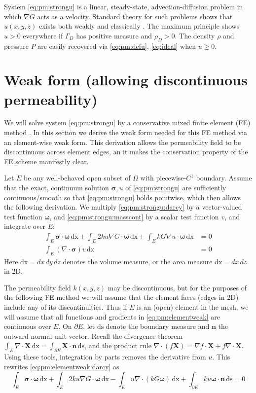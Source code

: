 \documentclass[11pt]{amsart}
\newcommand{\bn}{\mathbf{n}}
\newcommand{\bX}{\mathbf{X}}
\newcommand{\bsigma}{\bm{\sigma}}
\newcommand{\bomega}{\bm{\omega}}
\newcommand{\dx}{\mathrm{dx}}
\newcommand{\ds}{\mathrm{ds}}
\newcommand{\Div}{\nabla\cdot}
\newcommand{\grad}{\nabla}
\begin{document}
System \eqref{eq:pm:strongu} is a linear, steady-state, advection-diffusion problem in which $\grad G$ acts as a velocity.  Standard theory for such problems shows that $u(x,y,z)$ exists both weakly and classically \citep[Chapter 6]{Evans2010}.  The maximum principle shows $u>0$ everywhere if $\Gamma_D$ has positive measure and $\rho_D>0$.  The density $\rho$ and pressure $P$ are easily recovered via \eqref{eq:pm:defu}, \eqref{eq:ideal} when $u\ge 0$.

\section{Weak form (allowing discontinuous permeability)}

We will solve system \eqref{eq:pm:strongu} by a conservative mixed finite element (FE) method \citep{Boffi2013}.  In this section we derive the weak form needed for this FE method via an element-wise weak form.  This derivation allows the permeability field to be discontinuous across element edges, an it makes the conservation property of the FE scheme manifestly clear.

Let $E$ be any well-behaved open subset of $\Omega$ with piecewise-$C^1$ boundary.  Assume that the exact, continuum solution $\bsigma,u$ of \eqref{eq:pm:strongu} are sufficiently continuous/smooth so that \eqref{eq:pm:strongu} holds pointwise, which then allows the following derivation.  We multiply \eqref{eq:pm:strongu:darcy} by a vector-valued test function $\bomega$, and \eqref{eq:pm:strongu:masscont} by a scalar test function $v$, and integrate over $E$:
\begin{subequations}
\label{eq:pm:elementweak}
\begin{align}
\int_E \bsigma\cdot \bomega\,\dx + \int_E 2 k u \grad G \cdot \bomega\,\dx + \int_E k G \grad u \cdot \bomega\,\dx &= 0 \label{eq:pm:elementweak:darcy} \\
\int_E (\Div \bsigma) v\,\dx &= 0 \label{eq:pm:elementweak:masscont}
\end{align}
\end{subequations}
Here $\dx = dx\,dy\,dz$ denotes the volume measure, or the area measure $\dx = dx\,dz$ in 2D.

The permeability field $k(x,y,z)$ may be discontinuous, but for the purposes of the following FE method we will assume that the element faces (edges in 2D) include any of its discontinuities.  Thus if $E$ is an (open) element in the mesh, we will assume that all functions and gradients in \eqref{eq:pm:elementweak} are continuous over $E$.  On $\partial E$, let $\ds$ denote the boundary measure and $\bn$ the outward normal unit vector.  Recall the divergence theorem $\int_E \Div \bX\,\dx = \int_{\partial E} \bX\cdot \bn\,\ds$, and the product rule $\Div(f\bX) = \grad f \cdot \bX + f \Div \bX$.  Using these tools, integration by parts removes the derivative from $u$.  This rewrites \eqref{eq:pm:elementweak:darcy} as
\begin{equation}
\int_E \bsigma\cdot \bomega\,\dx + \int_E 2 k u \grad G \cdot \bomega\,\dx - \int_E u \Div\left(k G \bomega\right)\,\dx + \int_{\partial E} k u \bomega\cdot\bn\,\ds = 0 \label{eq:elementweak:darcy:early}
\end{equation}
\end{document}
